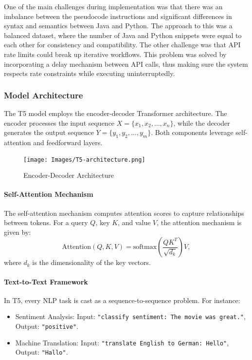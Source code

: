 \documentclass{dhbenelux}
\begin{document}
One of the main challenges during implementation was that there was an imbalance between the pseudocode instructions and significant differences in syntax and semantics between Java and Python. The approach to this was a balanced dataset, where the number of Java and Python snippets were equal to each other for consistency and compatibility. The other challenge was that API rate limits could break up iterative workflows. This problem was solved by incorporating a delay mechanism between API calls, thus making sure the system respects rate constraints while executing uninterruptedly.
\subsubsection{Model Architecture}
The T5 model employs the encoder-decoder Transformer architecture. The encoder processes the input sequence $X = \{x_1, x_2, \dots, x_n\}$, while the decoder generates the output sequence $Y = \{y_1, y_2, \dots, y_m\}$. Both components leverage self-attention and feedforward layers.

\begin{figure}[h]
\caption{Encoder-Decoder Architecture}
\centering
\texttt{[image: Images/T5-architecture.png]}
\label{fig:encoder-decoder-architecture}
\end{figure}

\paragraph{Self-Attention Mechanism}
The self-attention mechanism computes attention scores to capture relationships between tokens. For a query $Q$, key $K$, and value $V$, the attention mechanism is given by:
\begin{equation}
\text{Attention}(Q, K, V) = \text{softmax}\left(\frac{QK^T}{\sqrt{d_k}}\right)V,
\label{eq:attention-mechanism}
\end{equation}
where $d_k$ is the dimensionality of the key vectors.

\paragraph{Text-to-Text Framework}
In T5, every NLP task is cast as a sequence-to-sequence problem. For instance:
\begin{itemize}
    \item Sentiment Analysis: Input: \texttt{"classify sentiment: The movie was great."}, Output: \texttt{"positive"}.
    \item Machine Translation: Input: \texttt{"translate English to German: Hello"}, Output: \texttt{"Hallo"}.
\end{itemize}
\end{document}
